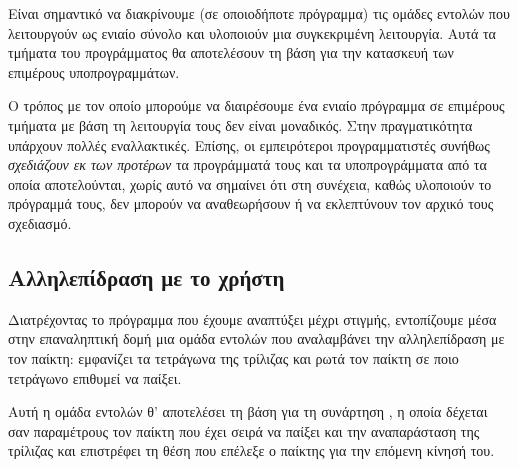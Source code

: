 \documentclass[a4paper,11pt,oneside]{book}
\begin{document}
Είναι σημαντικό να διακρίνουμε (σε οποιοδήποτε πρόγραμμα) τις ομάδες εντολών που λειτουργούν ως ενιαίο σύνολο και υλοποιούν μια συγκεκριμένη λειτουργία. Αυτά τα τμήματα του προγράμματος θα αποτελέσουν τη βάση για την κατασκευή των επιμέρους υποπρογραμμάτων.

Ο τρόπος με τον οποίο μπορούμε να διαιρέσουμε ένα ενιαίο πρόγραμμα σε επιμέρους τμήματα με βάση τη λειτουργία τους δεν είναι μοναδικός. Στην πραγματικότητα υπάρχουν πολλές εναλλακτικές. Επίσης, οι εμπειρότεροι προγραμματιστές συνήθως \emph{σχεδιάζουν εκ των προτέρων} τα προγράμματά τους και τα υποπρογράμματα από τα οποία αποτελούνται, χωρίς αυτό να σημαίνει ότι στη συνέχεια, καθώς υλοποιούν το πρόγραμμά τους, δεν μπορούν να αναθεωρήσουν ή να εκλεπτύνουν τον αρχικό τους σχεδιασμό.

\subsection{Αλληλεπίδραση με το χρήστη}

Διατρέχοντας το πρόγραμμα που έχουμε αναπτύξει μέχρι στιγμής, εντοπίζουμε μέσα στην επαναληπτική δομή μια ομάδα εντολών που αναλαμβάνει την αλληλεπίδραση με τον παίκτη: εμφανίζει τα τετράγωνα της τρίλιζας και ρωτά τον παίκτη σε ποιο τετράγωνο επιθυμεί να παίξει.


Αυτή η ομάδα εντολών θ' αποτελέσει τη βάση για τη συνάρτηση , η οποία δέχεται σαν παραμέτρους τον παίκτη  που έχει σειρά να παίξει και την αναπαράσταση  της τρίλιζας και επιστρέφει τη θέση που επέλεξε ο παίκτης για την επόμενη κίνησή του.

\clearpage
\end{document}
